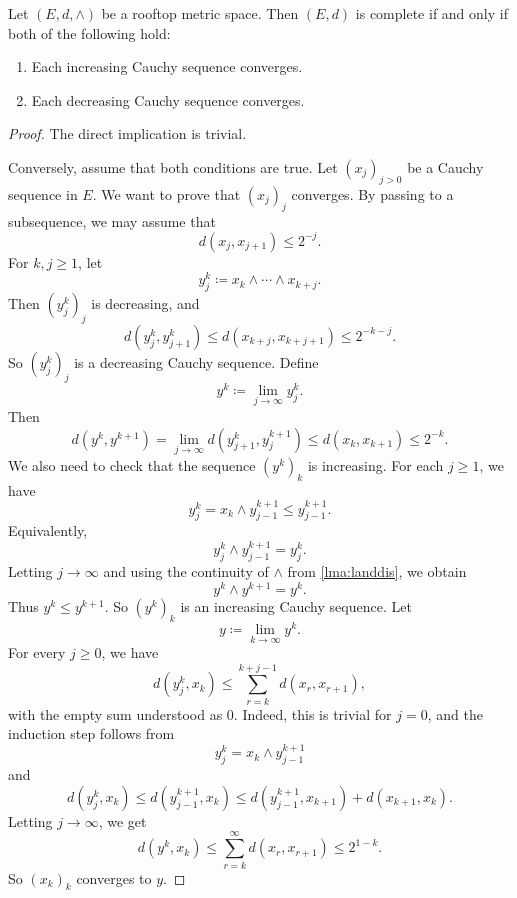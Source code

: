 \begin{proposition}\label{prop:rooftopcomp}
	Let $(E,d,\land)$ be a rooftop metric space. Then $(E,d)$ is complete if and only if both of the following hold:
	\begin{enumerate}
		\item\label{itm:prop:rooftopcomp:1} Each increasing Cauchy sequence converges.
		\item\label{itm:prop:rooftopcomp:2} Each decreasing Cauchy sequence converges.
	\end{enumerate}
\end{proposition}
\begin{proof}
	The direct implication is trivial.

	Conversely, assume that both conditions are true.
	Let $(x_j)_{j>0}$ be a Cauchy sequence in $E$. We want to prove that $(x_j)_j$ converges. By passing to a subsequence, we may assume that
	\[
	d\left(x_j,x_{j+1}\right)\leq 2^{-j}.
	\]
	For $k,j\geq 1$, let
	\[
	y_j^k\coloneqq x_k\land \cdots \land x_{k+j}.
	\]
	Then $(y_j^k)_j$ is decreasing, and
	\[
	d\left(y_j^k,y_{j+1}^k\right)\leq d\left(x_{k+j},x_{k+j+1}\right)\leq 2^{-k-j}.
	\]
	So $(y_j^k)_j$ is a decreasing Cauchy sequence. Define
	\[
	y^k\coloneqq \lim_{j\to\infty}y_j^k.
	\]
	Then
	\[
	d\left(y^k,y^{k+1}\right)=\lim_{j\to\infty}d\left(y_{j+1}^k,y_j^{k+1}\right)\leq d\left(x_k,x_{k+1}\right)\leq 2^{-k}.
	\]
    We also need to check that the sequence $(y^k)_k$ is increasing. For each $j\geq 1$, we have
    \[
        y_j^k=x_k\land y_{j-1}^{k+1}\leq y_{j-1}^{k+1}.
    \]
    Equivalently,
    \[
        y_j^k\land y_{j-1}^{k+1}=y_j^k.
    \]
    Letting $j\to\infty$ and using the continuity of $\land$ from \cref{lma:landdis}, we obtain
    \[
        y^k\land y^{k+1}=y^k.
    \]
    Thus $y^k\leq y^{k+1}$.
	So $(y^k)_k$ is an increasing Cauchy sequence. Let
	\[
	y\coloneqq \lim_{k\to\infty}y^k.
	\]
	For every $j\geq 0$, we have
	\[
	    d\left(y_j^k,x_k\right)\leq \sum_{r=k}^{k+j-1}d\left(x_r,x_{r+1}\right),
	\]
	with the empty sum understood as $0$. Indeed, this is trivial for $j=0$, and the induction step follows from
	\[
	    y_j^k=x_k\land y_{j-1}^{k+1}
	\]
	and
	\[
	    d\left(y_j^k,x_k\right)\leq d\left(y_{j-1}^{k+1},x_k\right)\leq d\left(y_{j-1}^{k+1},x_{k+1}\right)+d\left(x_{k+1},x_k\right).
	\]
	Letting $j\to\infty$, we get
	\[
	d\left(y^k,x_k\right)\leq \sum_{r=k}^{\infty}d\left(x_r,x_{r+1}\right)\leq 2^{1-k}.
	\]
	So $(x_k)_k$ converges to $y$.
\end{proof}


